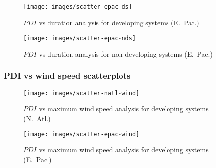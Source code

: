 \begin{figure}[H]
	\centering
	\texttt{[image: images/scatter-epac-ds]}
	\caption{$PDI$ vs duration analysis for developing systems (E.~Pac.)}
	\label{fig:scatter-epac-ds}
\end{figure}

\begin{figure}[H]
	\centering
	\texttt{[image: images/scatter-epac-nds]}
	\caption{$PDI$ vs duration analysis for non-developing systems (E.~Pac.)}
	\label{fig:scatter-epac-nds}
\end{figure}

\newpage
\subsubsection{PDI vs wind speed scatterplots}\label{ssec:pdi-corr-speed}
\begin{figure}[H]
	\centering
	\texttt{[image: images/scatter-natl-wind]}
	\caption{$PDI$ vs maximum wind speed analysis for developing systems (N.~Atl.)}
	\label{fig:scatter-natl-wind}
\end{figure}

\begin{figure}[H]
	\centering
	\texttt{[image: images/scatter-epac-wind]}
	\caption{$PDI$ vs maximum wind speed analysis for developing systems (E.~Pac.)}
	\label{fig:scatter-epac-wind}
\end{figure}


